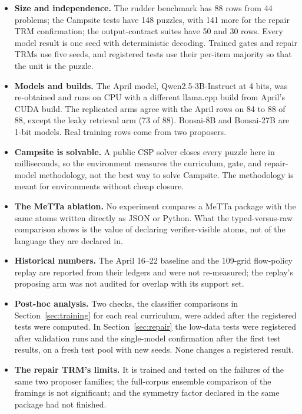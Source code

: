 \documentclass[11pt]{article}
\begin{document}
\begin{itemize}[leftmargin=*]
  \item \textbf{Size and independence.} The rudder benchmark has 88 rows from 44 problems; the Campsite tests have 148 puzzles, with 141 more for the repair TRM confirmation; the output-contract suites have 50 and 30 rows. Every model result is one seed with deterministic decoding. Trained gates and repair TRMs use five seeds, and registered tests use their per-item majority so that the unit is the puzzle.
  \item \textbf{Models and builds.} The April model, Qwen2.5-3B-Instruct at 4 bits, was re-obtained and runs on CPU with a different llama.cpp build from April's CUDA build. The replicated arms agree with the April rows on 84 to 88 of 88, except the leaky retrieval arm (73 of 88). Bonsai-8B and Bonsai-27B are 1-bit models. Real training rows come from two proposers.
  \item \textbf{Campsite is solvable.} A public CSP solver closes every puzzle here in milliseconds, so the environment measures the curriculum, gate, and repair-model methodology, not the best way to solve Campsite. The methodology is meant for environments without cheap closure.
  \item \textbf{The MeTTa ablation.} No experiment compares a MeTTa package with the same atoms written directly as JSON or Python. What the typed-versus-raw comparison shows is the value of declaring verifier-visible atoms, not of the language they are declared in.
  \item \textbf{Historical numbers.} The April 16--22 baseline and the 109-grid flow-policy replay are reported from their ledgers and were not re-measured; the replay's proposing arm was not audited for overlap with its support set.
  \item \textbf{Post-hoc analysis.} Two checks, the classifier comparisons in Section~\ref{sec:training} for each real curriculum, were added after the registered tests were computed. In Section~\ref{sec:repair} the low-data tests were registered after validation runs and the single-model confirmation after the first test results, on a fresh test pool with new seeds. None changes a registered result.
  \item \textbf{The repair TRM's limits.} It is trained and tested on the failures of the same two proposer families; the full-corpus ensemble comparison of the framings is not significant; and the symmetry factor declared in the same package had not finished.
\end{itemize}
\end{document}
